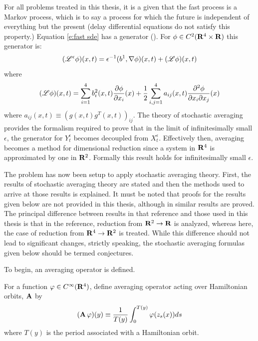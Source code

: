For all problems treated in this thesis, it is a given that the fast process is a Markov process, which is to say a process for which the future is independent of everything but the present (delay differential equations do not satisfy this property.) Equation \eqref{e:fast sde} has a generator (\citep[\S 7.3]{oksendal98:_stoch_differ_equat}). For $\phi \in C^2(\mathbf R^4 \times \mathbf R)$ this generator is:
\[
(\mathscr L^\epsilon \phi)(x,t) = \epsilon^{-1} (b^1,\nabla \phi)(x,t) + (\mathscr L \phi)(x,t)
\]
where
\[
(\mathscr L \phi)(x,t) = \sum_{i = 1}^4 b_i^2(x,t) \frac{\partial \phi}{\partial x_i}(x) + \frac12 \sum_{i,j=1}^4 a_{ij}(x,t) \frac{\partial^2 \phi}{\partial x_i \partial x_j}(x)
\]
where $a_{ij}(x,t) \equiv (g(x,t) g^T(x,t))_{ij}$. The theory of stochastic averaging provides the formalism required to prove that in the limit of infinitesimally small $\epsilon$, the generator for
$Y_t^\epsilon$ becomes decoupled from $X_t^\epsilon$. Effectively then, averaging becomes a method for dimensional reduction since a system in $\mathbf R^4$ is approximated by one in $\mathbf R^2$. Formally this result holds for infinitesimally small $\epsilon$.

The problem has now been setup to apply stochastic averaging theory. First, the results of stochastic averaging theory are stated and then the methods used to arrive at those results is explained. It must be noted that proofs for the results given below are not provided in this thesis, although in \citet{namachchivaya01:_unified_approac_noisy_nonlin_mathieu_type_system} similar results are proved. The principal difference between results in that reference and those used in this thesis is that in the reference, reduction from $\mathbf R^2 \to \mathbf R$ is analyzed, whereas here, the case of reduction from $\mathbf R^4 \to \mathbf R^2$ is treated. While this difference should not lead to significant changes, strictly speaking, the stochastic averaging formulas given below should be termed conjectures.

To begin, an averaging operator is defined.
\begin{definition}
\label{d:Aave}
For a function $\varphi \in C^\infty(\mathbf R^4)$, define averaging operator acting over Hamiltonian orbits, $\operatorname{\mathbf A}$ by
\[
(\operatorname{\mathbf A} \varphi) (y) \equiv \frac{1}{T(y)} \int_0^{T(y)} \varphi(z_s(x)) ds
\]
where $T(y)$ is the period associated with a Hamiltonian orbit.
\end{definition}

